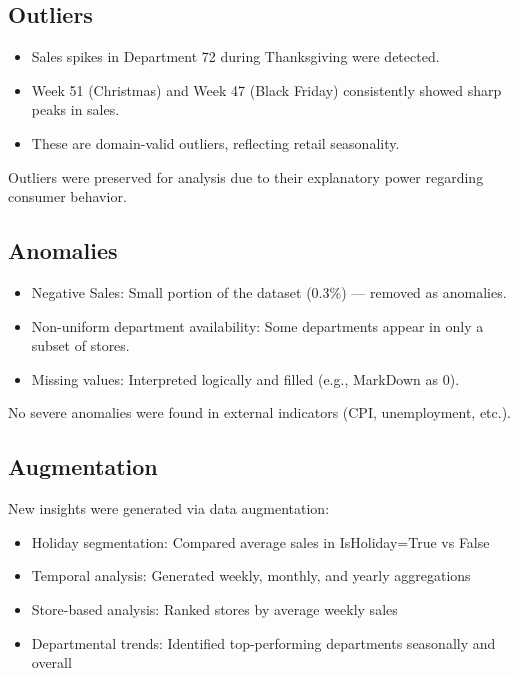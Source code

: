 \subsection{Outliers}

\begin{itemize}
	\item Sales spikes in Department 72 during Thanksgiving were detected.
	\item Week 51 (Christmas) and Week 47 (Black Friday) consistently showed sharp peaks in sales.
	\item These are domain-valid outliers, reflecting retail seasonality.
\end{itemize}

Outliers were preserved for analysis due to their explanatory power regarding consumer behavior.


\subsection{Anomalies}

\begin{itemize}
	\item Negative Sales: Small portion of the dataset (0.3\%) — removed as anomalies.
	\item Non-uniform department availability: Some departments appear in only a subset of stores.
	\item Missing values: Interpreted logically and filled (e.g., MarkDown as 0).
\end{itemize}

No severe anomalies were found in external indicators (CPI, unemployment, etc.).


\subsection{Augmentation}

New insights were generated via data augmentation:

\begin{itemize}
	\item Holiday segmentation: Compared average sales in IsHoliday=True vs False
	\item Temporal analysis: Generated weekly, monthly, and yearly aggregations
	\item Store-based analysis: Ranked stores by average weekly sales
	\item Departmental trends: Identified top-performing departments seasonally and overall
\end{itemize}



